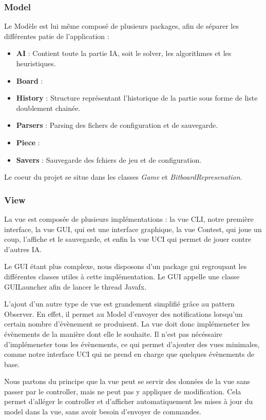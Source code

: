 \documentclass{article}
\begin{document}
\subsubsection{Model}
Le Modèle est lui même composé de plusieurs packages, afin de séparer les différentes patie de l'application :
\begin{itemize}
    \item \textbf{AI} : Contient toute la partie IA, soit le solver, les algorithmes et les heuristiques.
    \item \textbf{Board} : 
    \item \textbf{History} : Structure représentant l'historique de la partie sous forme de liste doublement chainée.
    \item \textbf{Parsers} : Parsing des fichers de configuration et de sauvegarde.
    \item \textbf{Piece} : 
    \item \textbf{Savers} : Sauvegarde des fchiers de jeu et de configuration.
\end{itemize}

Le coeur du projet se situe dans les classes \textit{Game} et \textit{BitboardRepresenation}.


\subsubsection{View}
La vue est composée de plusieurs implémentations : la vue CLI, notre première interface, la vue GUI, qui est une interface graphique, la vue Contest, qui joue un coup, l'affiche et le sauvegarde,
et enfin la vue UCI qui permet de jouer contre d'autres IA.

Le GUI étant plus complexe, nous disposons d'un package gui regroupant les différentes classes utiles à cette implémentation. Le GUI appelle une classe GUILauncher afin de lancer
le thread Javafx.

L'ajout d'un autre type de vue est grandement simplifié grâce au pattern Observer. En effet, il permet au Model d'envoyer des notifications lorsqu'un certain nombre d'évènement
se produisent. La vue doit donc implémeneter les évènements de la manière dont elle le souhaite. Il n'est pas nécéssaire d'implémeneter tous les évènements, ce qui permet d'ajouter des vues minimales,
comme notre interface UCI qui ne prend en charge que quelques évènements de base.

Nous partons du principe que la vue peut se servir des données de la vue sans passer par le controller, mais ne peut pas y appliquer de modification. Cela permet d'alléger le controller
et d'afficher automatiquement les mises à jour du model dans la vue, sans avoir besoin d'envoyer de commandes.
\end{document}
